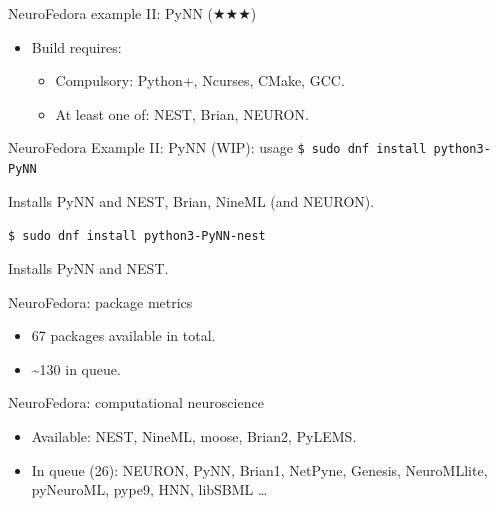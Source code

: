 \begin{frame}[c]{NeuroFedora example II\@: PyNN (\(\bigstar\bigstar\bigstar\))}
  \begin{itemize}
    \item Build requires\footnotemark:
      \pause{}
      \begin{itemize}
        \item \alert{Compulsory:} Python+, Ncurses, CMake, GCC\@.
        \item \alert{At least one of:} NEST, Brian, NEURON\@.
      \end{itemize}
  \end{itemize}
\end{frame}
\begin{frame}[c]{NeuroFedora Example II\@: PyNN (WIP): usage}
  \texttt{\$ sudo dnf install python3-PyNN}

  Installs PyNN and NEST, Brian\footnotemark{}, NineML (and NEURON\footnotemark{}).

  \pause{}
  \texttt{\$ sudo dnf install python3-PyNN-nest}

  Installs PyNN and NEST\@.
\end{frame}
\begin{frame}[c]{NeuroFedora: package metrics}
  \begin{itemize}
    \item 67 packages available in total\footnotemark.
    \item \textasciitilde{}130 in queue\footnotemark.
  \end{itemize}
\end{frame}
\begin{frame}[c]{NeuroFedora: computational neuroscience}
  \begin{itemize}
    \item Available: NEST, NineML, moose, Brian2, PyLEMS\@.
    \item In queue (26)\footnotemark: NEURON, PyNN, Brian1, NetPyne, Genesis, NeuroMLlite, pyNeuroML, pype9, HNN, libSBML \ldots
  \end{itemize}
\end{frame}
